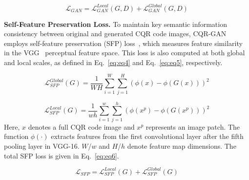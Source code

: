 \documentclass[preprint,12pt]{elsarticle}
\begin{document}
\begin{equation}
    \mathcal{L}_{GAN} = \mathcal{L}_{GAN}^{Local}(G, D) +\mathcal{L}_{GAN}^{Global}(G, D) 
    \label{eq:eq3}
\end{equation}



\textbf{Self-Feature Preservation Loss.} To maintain key semantic information consistency between original and generated CQR code images, CQR-GAN employs self-feature preservation (SFP) loss~\cite{jiang2021enlightengan}, which measures feature similarity in the VGG~\cite{simonyan2014very} perceptual feature space. This loss is also computed at both global and local scales, as defined in Eq.~\ref{eq:eq4} and Eq.~\ref{eq:eq5}, respectively.

\begin{equation}
    \mathcal{L}_{SFP}^{Global}(G) =\frac{1}{WH} \sum_{i=1}^{W} \sum_{j=1}^{H}(\phi(x)-\phi(G(x)))^{2}
    \label{eq:eq4}
\end{equation}

\begin{equation}
    \mathcal{L}_{SFP}^{Local}(G) =\frac{1}{wh} \sum_{i=1}^{w} \sum_{j=1}^{h}(\phi (x^{p})-\phi(G(x^{p})))^{2}
    \label{eq:eq5}
\end{equation}
Here, $x$ denotes a full CQR code image and $x^p$ represents an image patch. The function $\phi(\cdot)$ extracts features from the first convolutional layer after the fifth pooling layer in VGG-16. $W$/$w$ and $H$/$h$ denote feature map dimensions. The total SFP loss is given in Eq.~\ref{eq:eq6}.

\begin{equation}
    \mathcal{L}_{SFP} =\mathcal{L}_{SFP}^{Local}(G) + \mathcal{L}_{SFP}^{Global}(G)
    \label{eq:eq6}
\end{equation}


\end{document}
